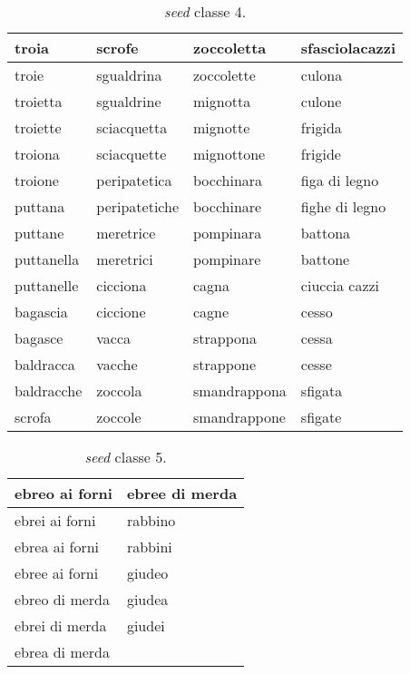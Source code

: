 \begin{table}[ht]
\centering
\begin{tabular}{|l|l|l|l|}
\hline
troia      & scrofe        & zoccoletta   & sfasciolacazzi \\ \hline
troie      & sgualdrina    & zoccolette   & culona         \\ \hline
troietta   & sgualdrine    & mignotta     & culone         \\ \hline
troiette   & sciacquetta   & mignotte     & frigida        \\ \hline
troiona    & sciacquette   & mignottone   & frigide        \\ \hline
troione    & peripatetica  & bocchinara   & figa di legno  \\ \hline
puttana    & peripatetiche & bocchinare   & fighe di legno \\ \hline
puttane    & meretrice     & pompinara    & battona        \\ \hline
puttanella & meretrici     & pompinare    & battone        \\ \hline
puttanelle & cicciona      & cagna        & ciuccia cazzi  \\ \hline
bagascia   & ciccione      & cagne        & cesso          \\ \hline
bagasce    & vacca         & strappona    & cessa          \\ \hline
baldracca  & vacche        & strappone    & cesse          \\ \hline
baldracche & zoccola       & smandrappona & sfigata        \\ \hline
scrofa     & zoccole       & smandrappone & sfigate        \\ \hline
\end{tabular}
\caption{\textit{seed} classe 4.}
\end{table}

\begin{table}[ht]
\centering
\begin{tabular}{|l|l|}
\hline
ebreo ai forni & ebree di merda \\ \hline
ebrei ai forni & rabbino        \\ \hline
ebrea ai forni & rabbini        \\ \hline
ebree ai forni & giudeo         \\ \hline
ebreo di merda & giudea         \\ \hline
ebrei di merda & giudei         \\ \hline
ebrea di merda &                \\ \hline
\end{tabular}
\caption{\textit{seed} classe 5.}
\end{table}

